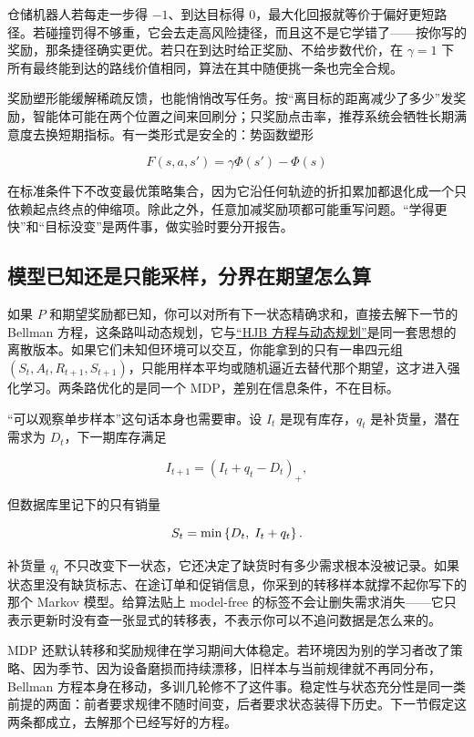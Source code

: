 仓储机器人若每走一步得 \(-1\)、到达目标得 \(0\)，最大化回报就等价于偏好更短路径。若碰撞罚得不够重，它会去走高风险捷径，而且这不是它学错了——按你写的奖励，那条捷径确实更优。若只在到达时给正奖励、不给步数代价，在 \(\gamma=1\) 下所有最终能到达的路线价值相同，算法在其中随便挑一条也完全合规。

奖励塑形能缓解稀疏反馈，也能悄悄改写任务。按``离目标的距离减少了多少''发奖励，智能体可能在两个位置之间来回刷分；只奖励点击率，推荐系统会牺牲长期满意度去换短期指标。有一类形式是安全的：势函数塑形

\[
F(s,a,s')=\gamma\Phi(s')-\Phi(s)
\]

在标准条件下不改变最优策略集合，因为它沿任何轨迹的折扣累加都退化成一个只依赖起点终点的伸缩项。除此之外，任意加减奖励项都可能重写问题。``学得更快''和``目标没变''是两件事，做实验时要分开报告。

\subsection{模型已知还是只能采样，分界在期望怎么算}

如果 \(P\) 和期望奖励都已知，你可以对所有下一状态精确求和，直接去解下一节的 Bellman 方程，这条路叫动态规划，它与\hyperref[sec:16-Control-and-Reinforcement-Learning/01-Optimal-Control/03]{``HJB 方程与动态规划''}是同一套思想的离散版本。如果它们未知但环境可以交互，你能拿到的只有一串四元组 \((S_t,A_t,R_{t+1},S_{t+1})\)，只能用样本平均或随机逼近去替代那个期望，这才进入强化学习。两条路优化的是同一个 MDP，差别在信息条件，不在目标。

``可以观察单步样本''这句话本身也需要审。设 \(I_t\) 是现有库存，\(q_t\) 是补货量，潜在需求为 \(D_t\)，下一期库存满足

\[
I_{t+1}=(I_t+q_t-D_t)_+ ,
\]

但数据库里记下的只有销量

\[
S_t=\min\left\{D_t,\;I_t+q_t\right\}.
\]

补货量 \(q_t\) 不只改变下一状态，它还决定了缺货时有多少需求根本没被记录。如果状态里没有缺货标志、在途订单和促销信息，你采到的转移样本就撑不起你写下的那个 Markov 模型。给算法贴上 model-free 的标签不会让删失需求消失——它只表示更新时没有查一张显式的转移表，不表示你可以不追问数据是怎么来的。

MDP 还默认转移和奖励规律在学习期间大体稳定。若环境因为别的学习者改了策略、因为季节、因为设备磨损而持续漂移，旧样本与当前规律就不再同分布，Bellman 方程本身在移动，多训几轮修不了这件事。稳定性与状态充分性是同一类前提的两面：前者要求规律不随时间变，后者要求状态装得下历史。下一节假定这两条都成立，去解那个已经写好的方程。
